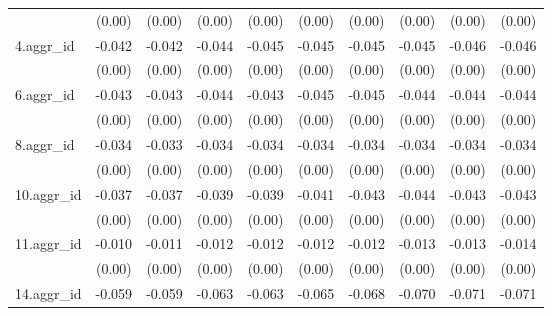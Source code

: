{\begin{tabular}{l*{9}{c}}
          &   (0.00)         &   (0.00)         &   (0.00)         &   (0.00)         &   (0.00)         &   (0.00)         &   (0.00)         &   (0.00)         &   (0.00)         \\
[1em]
4.aggr\_id &   -0.042\sym{***}&   -0.042\sym{***}&   -0.044\sym{***}&   -0.045\sym{***}&   -0.045\sym{***}&   -0.045\sym{***}&   -0.045\sym{***}&   -0.046\sym{***}&   -0.046\sym{***}\\
          &   (0.00)         &   (0.00)         &   (0.00)         &   (0.00)         &   (0.00)         &   (0.00)         &   (0.00)         &   (0.00)         &   (0.00)         \\
[1em]
6.aggr\_id &   -0.043\sym{***}&   -0.043\sym{***}&   -0.044\sym{***}&   -0.043\sym{***}&   -0.045\sym{***}&   -0.045\sym{***}&   -0.044\sym{***}&   -0.044\sym{***}&   -0.044\sym{***}\\
          &   (0.00)         &   (0.00)         &   (0.00)         &   (0.00)         &   (0.00)         &   (0.00)         &   (0.00)         &   (0.00)         &   (0.00)         \\
[1em]
8.aggr\_id &   -0.034\sym{***}&   -0.033\sym{***}&   -0.034\sym{***}&   -0.034\sym{***}&   -0.034\sym{***}&   -0.034\sym{***}&   -0.034\sym{***}&   -0.034\sym{***}&   -0.034\sym{***}\\
          &   (0.00)         &   (0.00)         &   (0.00)         &   (0.00)         &   (0.00)         &   (0.00)         &   (0.00)         &   (0.00)         &   (0.00)         \\
[1em]
10.aggr\_id&   -0.037\sym{***}&   -0.037\sym{***}&   -0.039\sym{***}&   -0.039\sym{***}&   -0.041\sym{***}&   -0.043\sym{***}&   -0.044\sym{***}&   -0.043\sym{***}&   -0.043\sym{***}\\
          &   (0.00)         &   (0.00)         &   (0.00)         &   (0.00)         &   (0.00)         &   (0.00)         &   (0.00)         &   (0.00)         &   (0.00)         \\
[1em]
11.aggr\_id&   -0.010\sym{***}&   -0.011\sym{***}&   -0.012\sym{***}&   -0.012\sym{***}&   -0.012\sym{***}&   -0.012\sym{***}&   -0.013\sym{***}&   -0.013\sym{***}&   -0.014\sym{***}\\
          &   (0.00)         &   (0.00)         &   (0.00)         &   (0.00)         &   (0.00)         &   (0.00)         &   (0.00)         &   (0.00)         &   (0.00)         \\
[1em]
14.aggr\_id&   -0.059\sym{***}&   -0.059\sym{***}&   -0.063\sym{***}&   -0.063\sym{***}&   -0.065\sym{***}&   -0.068\sym{***}&   -0.070\sym{***}&   -0.071\sym{***}&   -0.071\sym{***}\\

\end{tabular}}
